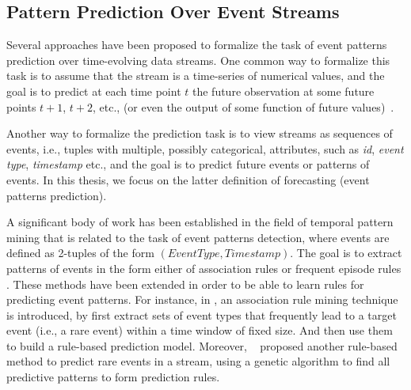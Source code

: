 

\subsection{Pattern Prediction Over Event Streams}

\par Several approaches have been proposed to formalize the task of event patterns prediction over time-evolving data streams.  One common way to formalize this task is to assume that the stream is a time-series of numerical values, and the goal is to predict at each time point $t$ the future observation at some future points $t+1$, $t+2$, etc., (or even the output of some function of future values)~\cite{montgomery_introduction_2015}. 



Another way to formalize the prediction task is to view streams as sequences of events,
i.e., tuples with multiple, possibly categorical, attributes, such as \textit{id}, \textit{event type}, \textit{timestamp} etc., and the goal is to predict future events or  patterns of events. In this thesis, we focus on the latter definition of forecasting (event patterns prediction).  

\par A significant body of work has been established in the field of temporal pattern mining that is related to the task of event patterns detection, where events are defined as 2-tuples of the form \((\mathit{EventType}, \mathit{Timestamp})\). The goal is to extract patterns of events in the form either of association rules \cite{agrawal_mining_1993} or frequent episode rules \cite{mannila_discovery_1997}. These methods have been extended in order to be able to learn rules for  predicting event patterns. For instance, in \cite{vilalta_predicting_2002}, an association rule mining technique is introduced, by first extract sets of event types that frequently lead to a target event (i.e., a rare event) within a time window of fixed size. And then use them to build a rule-based prediction model. Moreover,  ~\citet{weiss1998learning} proposed another rule-based method to predict rare events in a stream, using a genetic algorithm to find all predictive patterns to form prediction rules.  


